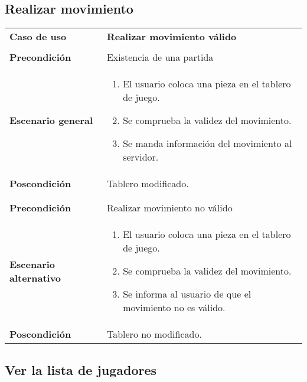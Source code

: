 \subsection{Realizar movimiento}
{\footnotesize
\begin{tabularx}{0.95\textwidth}{p{}|X}

\textbf{Caso de uso} & \textbf {Realizar movimiento válido} \\
& \\
\textbf{Precondición} & Existencia de una partida \\

\textbf{Escenario general} & \begin{enumerate}
\item El usuario coloca una pieza en el tablero de juego.
\item Se comprueba la validez del movimiento.
\item Se manda información del movimiento al servidor.

\end{enumerate} \\

\textbf{Poscondición} & Tablero modificado.\\
& \\
& \\
\textbf{Precondición} & Realizar movimiento no válido\\
\textbf{Escenario alternativo} & \begin{enumerate}
\item El usuario coloca una pieza en el tablero de juego.
\item Se comprueba la validez del movimiento.
\item Se informa al usuario de que el movimiento no es válido.

\end{enumerate} \\

\textbf{Poscondición} & Tablero no modificado.

\end{tabularx}
}

\subsection{Ver la lista de jugadores}

